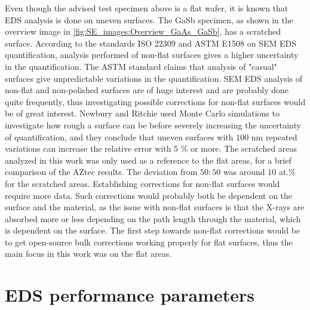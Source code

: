 Even though the advised test specimen above is a flat wafer, it is known that EDS analysis is done on uneven surfaces.
The GaSb specimen, as shown in the overview image in \cref{fig:SE_images:Overview_GaAs_GaSb}, has a scratched surface.
According to the standards ISO 22309 \cite{iso_quantification_22309} and ASTM E1508 \cite{astm_e1508_eds_quantification} on SEM EDS quantification, analysis performed of non-flat surfaces gives a higher uncertainty in the quantification.
The ASTM standard claims that analysis of "casual" surfaces give unpredictable variations in the quantification.
SEM EDS analysis of non-flat and non-polished surfaces are of huge interest and are probably done quite frequently, thus investigating possible corrections for non-flat surfaces would be of great interest.
Newbury and Ritchie \cite{newbury_ritchie_2013_flatness} used Monte Carlo simulations to investigate how rough a surface can be before severely increasing the uncertainty of quantification, and they conclude that uneven surfaces with $100$ nm repeated variations can increase the relative error with $5$ \% or more.
The scratched areas analyzed in this work was only used as a reference to the flat areas, for a brief comparison of the AZtec results.
The deviation from $50:50$ was around $10$ at.\% for the scratched areas.
Establishing corrections for non-flat surfaces would require more data.
Such corrections would probably both be dependent on the surface and the material, as the issue with non-flat surfaces is that the X-rays are absorbed more or less depending on the path length through the material, which is dependent on the surface.
The first step towards non-flat corrections would be to get open-source bulk corrections working properly for flat surfaces, thus the main focus in this work was on the flat areas.








\section{EDS performance parameters}
\label{discussion:performance}

